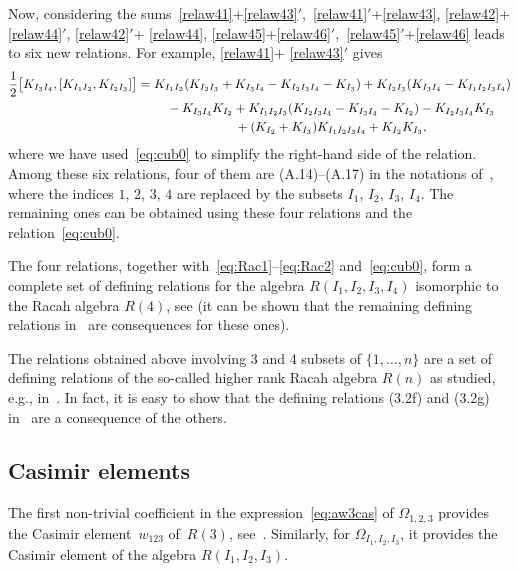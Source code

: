 \documentclass[pdftex]{sigma}
\numberwithin{equation}{section}
\theoremstyle{definition}
\begin{document}
Now, considering the sums~\eqref{relaw41}+\eqref{relaw43}$'$,~\eqref{relaw41}$'$+\eqref{relaw43}, \eqref{relaw42}+\eqref{relaw44}$'$,
\eqref{relaw42}$'$+ \eqref{relaw44},
\eqref{relaw45}+\eqref{relaw46}$'$,~\eqref{relaw45}$'$+\eqref{relaw46} leads to six new relations.
For example, \eqref{relaw41}+ \eqref{relaw43}$'$ gives
 \begin{gather*}%
\frac12\big[K_{I_3I_4} , [K_{I_1I_2},K_{I_2I_3}]\big] =
K_{I_1I_2}(K_{I_2I_3}+K_{I_3I_4}-K_{I_2I_3I_4}-K_{I_3}) +K_{I_2I_3}(K_{I_3I_4}-K_{I_1I_2I_3I_4})
\\
\hphantom{\frac12\big[K_{I_3I_4} , [K_{I_1I_2},K_{I_2I_3}]\big] =}{}-K_{I_3I_4} K_{I_2}
+K_{I_1I_2I_3}(K_{I_2I_3I_4}-K_{I_3I_4}-K_{I_2})-K_{I_2I_3I_4} K_{I_3}
\\
\hphantom{\frac12\big[K_{I_3I_4} , [K_{I_1I_2},K_{I_2I_3}]\big] =}{}
+(K_{I_2}+K_{I_3}) K_{I_1I_2I_3I_4}+K_{I_2} K_{I_3} ,
\end{gather*}
where we have used~\eqref{eq:cub0} to simplify the right-hand side of the relation.
Among these six relations, four of them
are (A.14)--(A.17) in the notations of~\cite{CFR}, where the indices $1$, $2$, $3$, $4$ are replaced by the subsets $I_1$, $I_2$, $I_3$, $I_4$. The remaining ones can be obtained using these four relations and the relation~\eqref{eq:cub0}.

The four relations, together with~\eqref{eq:Rac1}--\eqref{eq:Rac2} and~\eqref{eq:cub0}, form a complete set of defining relations for the algebra $R(I_1,I_2,I_3,I_4)$ isomorphic to the Racah algebra $R(4)$, see \cite[Appendix~A]{CFR} (it can be shown that the remaining defining relations
in~\cite[Appendix~A]{CFR} are consequences for these ones).

The relations obtained above involving 3 and 4 subsets of $\{1,\dots,n\}$ are a set of defining relations of the so-called higher rank Racah algebra $R(n)$ as studied, e.g., in~\cite{CGPV}. In fact, it is easy to show that the defining relations (3.2f) and (3.2g) in~\cite{CGPV} are a consequence of the others.

\subsection{Casimir elements}
The first non-trivial coefficient in the expression~\eqref{eq:aw3cas} of $\varOmega_{1,2,3}$ provides the Casimir element~$w_{123}$ of~$R(3)$, see~\cite{avatar}.
Similarly, for $\varOmega_{I_1,I_2,I_3}$, it provides the Casimir element of the algebra $R(I_1,I_2,I_3)$.
\end{document}
